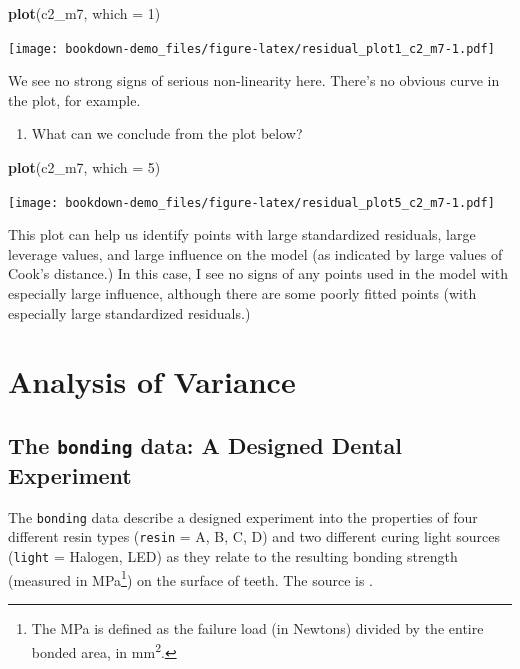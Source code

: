 \documentclass[]{book}
\newenvironment{Shaded}{\begin{snugshade}}{\end{snugshade}}
\newcommand{\KeywordTok}[1]{\textcolor[rgb]{0.13,0.29,0.53}{\textbf{#1}}}
\newcommand{\DataTypeTok}[1]{\textcolor[rgb]{0.13,0.29,0.53}{#1}}
\newcommand{\DecValTok}[1]{\textcolor[rgb]{0.00,0.00,0.81}{#1}}
\newcommand{\NormalTok}[1]{#1}
\providecommand{\tightlist}{%
  \setlength{\itemsep}{0pt}\setlength{\parskip}{0pt}}
\let\rmarkdownfootnote\footnote%
\def\footnote{\protect\rmarkdownfootnote}
\theoremstyle{definition}
\theoremstyle{definition}
\theoremstyle{definition}
\theoremstyle{remark}
\begin{document}
\begin{Shaded}
\begin{Highlighting}[]
\KeywordTok{plot}\NormalTok{(c2_m7, }\DataTypeTok{which =} \DecValTok{1}\NormalTok{)}
\end{Highlighting}
\end{Shaded}

\texttt{[image: bookdown-demo\_files/figure-latex/residual\_plot1\_c2\_m7-1.pdf]}

We see no strong signs of serious non-linearity here. There's no obvious
curve in the plot, for example.

\begin{enumerate}
\def\labelenumi{\arabic{enumi}.}
\setcounter{enumi}{1}
\tightlist
\item
  What can we conclude from the plot below?
\end{enumerate}

\begin{Shaded}
\begin{Highlighting}[]
\KeywordTok{plot}\NormalTok{(c2_m7, }\DataTypeTok{which =} \DecValTok{5}\NormalTok{)}
\end{Highlighting}
\end{Shaded}

\texttt{[image: bookdown-demo\_files/figure-latex/residual\_plot5\_c2\_m7-1.pdf]}

This plot can help us identify points with large standardized residuals,
large leverage values, and large influence on the model (as indicated by
large values of Cook's distance.) In this case, I see no signs of any
points used in the model with especially large influence, although there
are some poorly fitted points (with especially large standardized
residuals.)

\chapter{Analysis of Variance}\label{analysis-of-variance}

\section{\texorpdfstring{The \texttt{bonding} data: A Designed Dental
Experiment}{The bonding data: A Designed Dental Experiment}}\label{the-bonding-data-a-designed-dental-experiment}

The \texttt{bonding} data describe a designed experiment into the
properties of four different resin types (\texttt{resin} = A, B, C, D)
and two different curing light sources (\texttt{light} = Halogen, LED)
as they relate to the resulting bonding strength (measured in
MPa\footnote{The MPa is defined as the failure load (in Newtons) divided
  by the entire bonded area, in mm\textsuperscript{2}.}) on the surface
of teeth. The source is \citet{Kim2014}.
\end{document}
